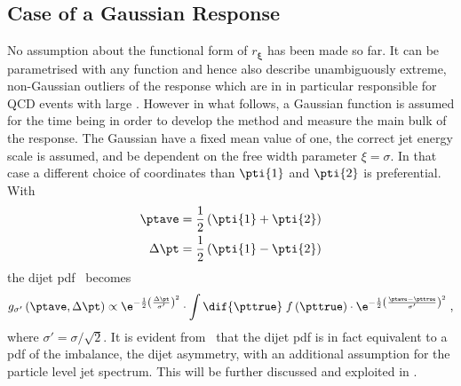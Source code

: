 \subsection{Case of a Gaussian Response}

No assumption about the functional form of $r_{\mathbf{\xi}}$ has been
made so far.
It can be parametrised with any function and hence also
describe unambiguously extreme, non-Gaussian outliers of the response which are in
in particular responsible for QCD events with large \met.
However in what follows, a Gaussian function is assumed for the time
being in order to develop the method and measure the main bulk of the
response.
The Gaussian have a fixed mean value of one, \ie the
correct jet energy scale is assumed, and be dependent on the free width
parameter \mbox{$\mathcal{\xi} = \sigma$}.
In that case a different choice of coordinates than $\pti{1}$ and
$\pti{2}$ is preferential.
With
\begin{align}
  \label{eq:ResFit:TransformedCoordinates}
  \begin{split}
    \ptave     &  = \frac{1}{2}\left(\pti{1}+\pti{2}\right) \\
    \Delta\pt  &  = \frac{1}{2}\left(\pti{1}-\pti{2}\right)
  \end{split}
\end{align} 
the dijet pdf~ becomes
\begin{equation}
  \label{eq:ResFit:DijetPdfTransformed}
   g_{\sigma'}\left(\ptave,\Delta\pt\right) \propto
   \e^{-\frac{1}{2}\left(\frac{\Delta\pt}{\sigma'}\right)^{2}}\cdot
   \int\dif{\pttrue}\;f\left(\pttrue\right)\cdot
   \e^{-\frac{1}{2}\left(\frac{\ptave - \pttrue}{\sigma'}\right)^{2}}
   \; ,
\end{equation}
where \mbox{$\sigma' = \sigma/\sqrt{2}$}.
It is evident from~ that the dijet
pdf is in fact equivalent to a pdf of the \pt imbalance, \ie the dijet
asymmetry, with an additional assumption for the particle level jet
\pt spectrum.
This will be further discussed and exploited in .
